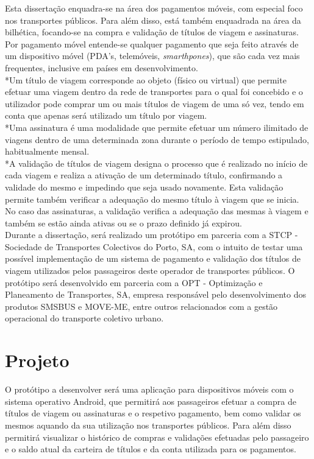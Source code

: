 Esta dissertação enquadra-se na área dos pagamentos móveis, com especial foco nos transportes públicos. Para além disso, está também enquadrada na área da bilhética, focando-se na compra e validação de títulos de viagem e assinaturas. 
\\Por pagamento móvel entende-se qualquer pagamento que seja feito através de um dispositivo móvel (PDA's, telemóveis, \textit{smarthpones}), que são cada vez mais frequentes, inclusive em países em desenvolvimento.\cite{Diniz2011}
\\*Um título de viagem corresponde ao objeto (físico ou virtual) que permite efetuar uma viagem dentro da rede de transportes para o qual foi concebido e o utilizador pode comprar um ou mais títulos de viagem de uma só vez, tendo em conta que apenas será utilizado um título por viagem.
\\*Uma assinatura é uma modalidade que permite efetuar um número ilimitado de viagens dentro de uma determinada zona durante o período de tempo estipulado, habitualmente mensal.
\\*A validação de títulos de viagem designa o processo que é realizado no início de cada viagem e realiza a ativação de um determinado título, confirmando a validade do mesmo e impedindo que seja usado novamente. Esta validação permite também verificar a adequação do mesmo título à viagem que se inicia. No caso das assinaturas, a validação verifica a adequação das mesmas à viagem e também se estão ainda ativas ou se o prazo definido já expirou.
\\Durante a dissertação, será realizado um protótipo em parceria com a STCP - Sociedade de Transportes Colectivos do Porto, SA, com o intuito de testar uma possível implementação de um sistema de pagamento e validação dos títulos de viagem utilizados pelos passageiros deste operador de transportes públicos. O protótipo será desenvolvido em parceria com a OPT -  Optimização e Planeamento de Transportes, SA, empresa responsável pelo desenvolvimento dos produtos SMSBUS e MOVE-ME, entre outros relacionados com a gestão operacional do transporte coletivo urbano. \cite{OPT}

\section{Projeto} \label{sec:proj}

O protótipo a desenvolver será uma aplicação para dispositivos móveis com o sistema operativo Android, que permitirá aos passageiros efetuar a compra de títulos de viagem ou assinaturas e o respetivo pagamento, bem como validar os mesmos aquando da sua utilização nos transportes públicos. Para além disso permitirá visualizar o histórico de compras e validações efetuadas pelo passageiro e o saldo atual da carteira de títulos e da conta utilizada para os pagamentos.

